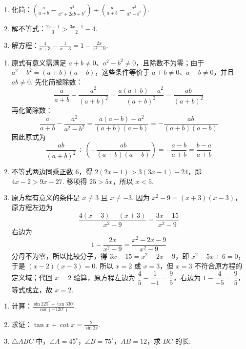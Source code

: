 \begin{problem}
\begin{enumerate}
\item
化简：\(\left(\frac{a}{a+b}-\frac{a^2}{a^2+2ab+b^2}\right)\div\left(\frac{a}{a+b}-\frac{a^2}{a^2-b^2}\right)\).
\item 解不等式：\(\frac{2x-1}{3}>\frac{3x-1}{2}-4\).
\item 解方程：\(\frac{4}{x+3}-\frac{1}{x-3}=1-\frac{2x}{x^2-9}\).
\end{enumerate}
\end{problem}

\begin{solution}
\begin{enumerate}
\item 原式有意义需满足 \(a+b\ne0\)、\(a^2-b^2\ne0\)，且除数不为零；由于 \(a^2-b^2=(a+b)(a-b)\)，这些条件等价于 \(a+b\ne0\)、\(a-b\ne0\)，并且 \(ab\ne0\). 先化简被除数：
\[
\frac{a}{a+b}-\frac{a^2}{(a+b)^2}
=\frac{a(a+b)-a^2}{(a+b)^2}
=\frac{ab}{(a+b)^2}
\]
再化简除数：
\[
\frac{a}{a+b}-\frac{a^2}{a^2-b^2}
=\frac{a(a-b)-a^2}{(a+b)(a-b)}
=-\frac{ab}{(a+b)(a-b)}
\]
因此原式为
\[
\frac{ab}{(a+b)^2}\div\left(-\frac{ab}{(a+b)(a-b)}\right)
 =-\frac{a-b}{a+b}=\frac{b-a}{a+b}
\]

\item 不等式两边同乘正数 \(6\)，得
\(2(2x-1)>3(3x-1)-24\)，即 \(4x-2>9x-27\).
移项得 \(25>5x\)，所以 \(x<5\).

\item 原方程有意义的条件是 \(x\ne3\) 且 \(x\ne-3\).
因为 \(x^2-9=(x+3)(x-3)\)，原方程左边为
\[
\frac{4(x-3)-(x+3)}{x^2-9}=\frac{3x-15}{x^2-9}
\]
右边为
\[
1-\frac{2x}{x^2-9}=\frac{x^2-2x-9}{x^2-9}
\]
分母不为零，所以比较分子，得
\(3x-15=x^2-2x-9\)，即
\(x^2-5x+6=0\)，于是 \((x-2)(x-3)=0\).
所以 \(x=2\) 或 \(x=3\)，但 \(x=3\) 不符合原方程的定义域；代回 \(x=2\) 验算，原方程左边为
\(\dfrac{4}{5}-\dfrac{1}{-1}=\dfrac{9}{5}\)，右边为
\(1-\dfrac{4}{-5}=\dfrac{9}{5}\)，等式成立，故 \(x=2\).
\end{enumerate}
\end{solution}

\begin{problem}
\begin{enumerate}
\item
计算：\(\frac{\sin 225^\circ+\tan 330^\circ}{\cos(-120^\circ)}\).
\item 求证：\(\tan x+\cot x=\frac{2}{\sin 2x}\).
\item \(\triangle ABC\) 中，\(\angle A=45^\circ\)，\(\angle B=75^\circ\)，\(AB=12\)，求 \(BC\) 的长.
\end{enumerate}
\end{problem}

